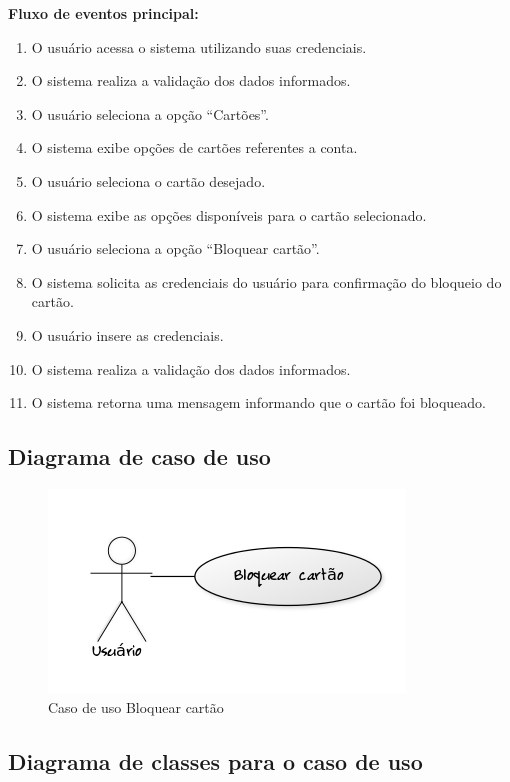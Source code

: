 \textbf{Fluxo de eventos principal:}

\begin{enumerate}
  \item O usuário acessa o sistema utilizando suas credenciais.
  \item O sistema realiza a validação dos dados informados.
  \item O usuário seleciona a opção ``Cartões''.
  \item O sistema exibe opções de cartões referentes a conta.
  \item O usuário seleciona o cartão desejado.
  \item O sistema exibe as opções disponíveis para o cartão selecionado.
  \item O usuário seleciona a opção ``Bloquear cartão''.
  \item O sistema solicita as credenciais do usuário para confirmação do bloqueio do cartão.
  \item O usuário insere as credenciais.
  \item O sistema realiza a validação dos dados informados.
  \item O sistema retorna uma mensagem informando que o cartão foi bloqueado.
\end{enumerate}

\subsection{Diagrama de caso de uso}

\begin{figure}[!htb]
     \centering
     \includegraphics[scale=0.6]{diagramas/caso-de-uso/imagens/bloquearCartao.png}
     \caption{Caso de uso Bloquear cartão}
\end{figure}

\subsection{Diagrama de classes para o caso de uso}
